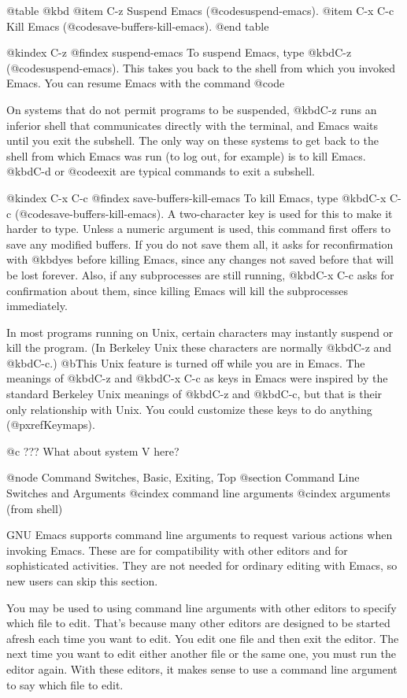 {{@table @kbd
@item C-z
Suspend Emacs (@code{suspend-emacs}).
@item C-x C-c
Kill Emacs (@code{save-buffers-kill-emacs}).
@end table

@kindex C-z
@findex suspend-emacs
  To suspend Emacs, type @kbd{C-z} (@code{suspend-emacs}).  This takes
you back to the shell from which you invoked Emacs.  You can resume
Emacs with the command @code{%

  On systems that do not permit programs to be suspended, @kbd{C-z} runs an
inferior shell that communicates directly with the terminal, and Emacs
waits until you exit the subshell.  The only way on these systems to get
back to the shell from which Emacs was run (to log out, for example) is to
kill Emacs.  @kbd{C-d} or @code{exit} are typical commands to exit a
subshell.

@kindex C-x C-c
@findex save-buffers-kill-emacs
  To kill Emacs, type @kbd{C-x C-c} (@code{save-buffers-kill-emacs}).  A
two-character key is used for this to make it harder to type.  Unless a
numeric argument is used, this command first offers to save any modified
buffers.  If you do not save them all, it asks for reconfirmation with
@kbd{yes} before killing Emacs, since any changes not saved before that will be
lost forever.  Also, if any subprocesses are still running, @kbd{C-x C-c}
asks for confirmation about them, since killing Emacs will kill the
subprocesses immediately.

  In most programs running on Unix, certain characters may instantly
suspend or kill the program.  (In Berkeley Unix these characters are
normally @kbd{C-z} and @kbd{C-c}.)  @b{This Unix feature is turned off
while you are in Emacs.}  The meanings of @kbd{C-z} and @kbd{C-x C-c} as
keys in Emacs were inspired by the standard Berkeley Unix meanings of
@kbd{C-z} and @kbd{C-c}, but that is their only relationship with
Unix.  You could customize these keys to do anything (@pxref{Keymaps}).

@c ??? What about system V here?

@node Command Switches, Basic, Exiting, Top
@section Command Line Switches and Arguments
@cindex command line arguments
@cindex arguments (from shell)


  GNU Emacs supports command line arguments to request various actions
when invoking Emacs.  These are for compatibility with other editors and
for sophisticated activities.  They are not needed for ordinary editing
with Emacs, so new users can skip this section.

  You may be used to using command line arguments with other editors
to specify which file to edit.  That's because many other editors are
designed to be started afresh each time you want to edit.  You
edit one file and then exit the editor.  The next time you want to edit
either another file or the same one, you must run the editor again.
With these editors, it makes sense to use a command line argument
to say which file to edit.

}}}
